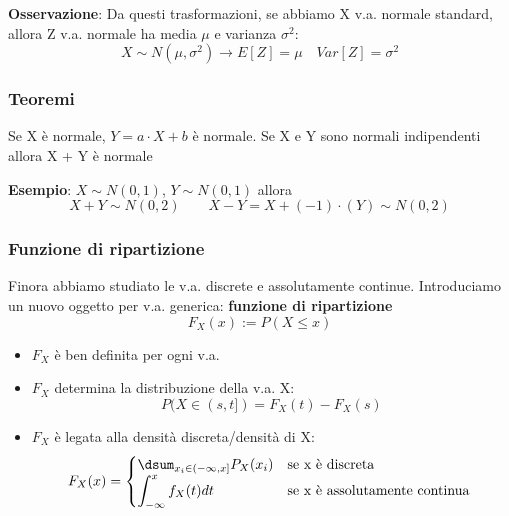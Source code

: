 \noindent \textbf{Osservazione}: Da questi trasformazioni, se abbiamo X v.a. normale standard, allora Z v.a. normale ha media $\mu$ e varianza $\sigma^2$: $$X \sim N(\mu, \sigma^2) \rightarrow{} E[Z] = \mu \quad Var[Z] = \sigma^2$$

\subsubsection{Teoremi}
Se X è normale, $Y = a \cdot X + b$ è normale. \newline Se X e Y sono normali indipendenti allora X + Y è normale

\begin{tcolorbox}
    \textbf{Esempio}: $X \sim N(0,1)$, $Y \sim N(0,1)$ allora $$X + Y \sim N(0,2) \qquad X - Y = X + (-1) \cdot (Y) \sim N(0,2)$$
\end{tcolorbox}

\subsubsection{Funzione di ripartizione}

Finora abbiamo studiato le v.a. discrete e assolutamente continue. Introduciamo un nuovo oggetto per v.a. generica: \textbf{funzione di ripartizione} $$F_X(x) := P(X \leq x)$$ 
\begin{itemize}
    \item $F_X$ è ben definita per ogni v.a.
    \item $F_X$ determina la distribuzione della v.a. X: $$P(X \in (s,t]) = F_X(t) - F_X(s)$$
    \item $F_X$ è legata alla densità discreta/densità di X: 
\begin{equation}
  F_X(x) =
    \begin{cases}
        \dsum_{x_i \in ( -\infty, x]} P_X(x_i) & \text{se x è discreta }\\
        \displaystyle\int_{-\infty}^x f_X(t)dt& \text{se x è assolutamente continua }\\
    \end{cases}       
\end{equation}
\end{itemize}

